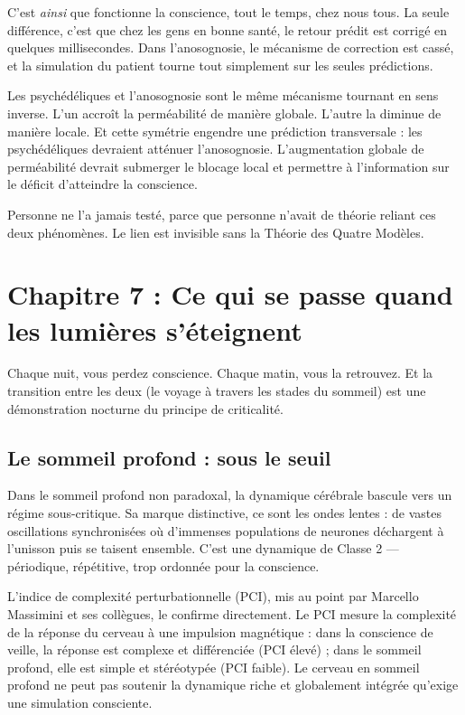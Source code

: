 \documentclass[11pt, twoside, openright]{book}
\begin{document}
C'est \textit{ainsi} que fonctionne la conscience, tout le temps, chez nous tous. La seule différence, c'est que chez les gens en bonne santé, le retour prédit est corrigé en quelques millisecondes. Dans l'anosognosie, le mécanisme de correction est cassé, et la simulation du patient tourne tout simplement sur les seules prédictions.

Les psychédéliques et l'anosognosie sont le même mécanisme tournant en sens inverse. L'un accroît la perméabilité de manière globale. L'autre la diminue de manière locale. Et cette symétrie engendre une prédiction transversale : les psychédéliques devraient atténuer l'anosognosie. L'augmentation globale de perméabilité devrait submerger le blocage local et permettre à l'information sur le déficit d'atteindre la conscience.

Personne ne l'a jamais testé, parce que personne n'avait de théorie reliant ces deux phénomènes. Le lien est invisible sans la Théorie des Quatre Modèles.


\chapter*{Chapitre 7 : Ce qui se passe quand les lumières s'éteignent}

Chaque nuit, vous perdez conscience. Chaque matin, vous la retrouvez. Et la transition entre les deux (le voyage à travers les stades du sommeil) est une démonstration nocturne du principe de criticalité.

\section*{Le sommeil profond : sous le seuil}

Dans le sommeil profond non paradoxal, la dynamique cérébrale bascule vers un régime sous-critique. Sa marque distinctive, ce sont les ondes lentes : de vastes oscillations synchronisées où d'immenses populations de neurones déchargent à l'unisson puis se taisent ensemble. C'est une dynamique de Classe 2 --- périodique, répétitive, trop ordonnée pour la conscience.

L'indice de complexité perturbationnelle (PCI), mis au point par Marcello Massimini et ses collègues, le confirme directement. Le PCI mesure la complexité de la réponse du cerveau à une impulsion magnétique : dans la conscience de veille, la réponse est complexe et différenciée (PCI élevé) ; dans le sommeil profond, elle est simple et stéréotypée (PCI faible). Le cerveau en sommeil profond ne peut pas soutenir la dynamique riche et globalement intégrée qu'exige une simulation consciente.
\end{document}
